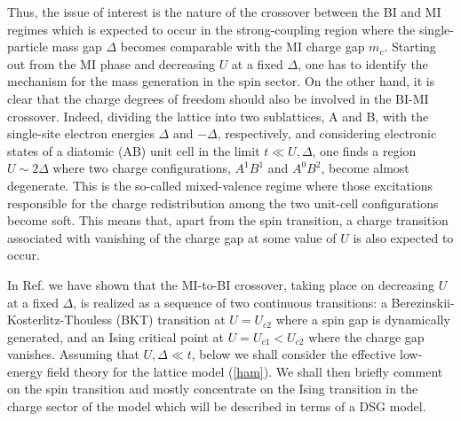 Thus, the issue of interest is the nature of the crossover between the BI and MI
regimes which is expected to occur in the strong-coupling region where the
single-particle mass gap $\Delta$ becomes comparable with the MI charge gap 
$m_c$.
Starting out from the MI phase and decreasing $U$ at a fixed $\Delta$, 
one has to identify the mechanism
for the mass generation in the spin sector. On the other hand, 
it is clear that the charge degrees of freedom should also be involved
in the BI-MI crossover. Indeed,
dividing the lattice into two sublattices, A and B, with the single-site
electron energies $\Delta$ and $-\Delta$, respectively, and
considering
electronic states of a diatomic (AB) unit cell in
the limit $t \ll U, \Delta$, one finds a region $U \sim 2\Delta$ where
two charge 
configurations, $A^1 B^1$ and $A^0 B^2$, become almost degenerate. This is the
so-called mixed-valence regime where those excitations responsible for
the charge redistribution among the two unit-cell configurations become soft.
This means that, apart from the spin transition, a charge transition associated
with vanishing of the charge gap at some value of $U$ is also expected
to occur.

In Ref.\cite{FGN} we have shown that the MI-to-BI crossover, taking place
on decreasing $U$ at a fixed $\Delta$, is realized as a sequence of two
continuous transitions: a Berezinskii-Kosterlitz-Thouless (BKT) transition
at $U = U_{c2}$ where a spin gap is dynamically generated, and an Ising
critical point at $U = U_{c1} < U_{c2}$ where the charge gap vanishes. 
Assuming that $U, \Delta \ll t$,
below we
shall consider the effective low-energy field theory for the lattice model
(\ref{ham}). We shall then briefly comment on the spin transition and
mostly concentrate
on the Ising transition in the charge sector of the model which will be
described in terms of a DSG model. 


